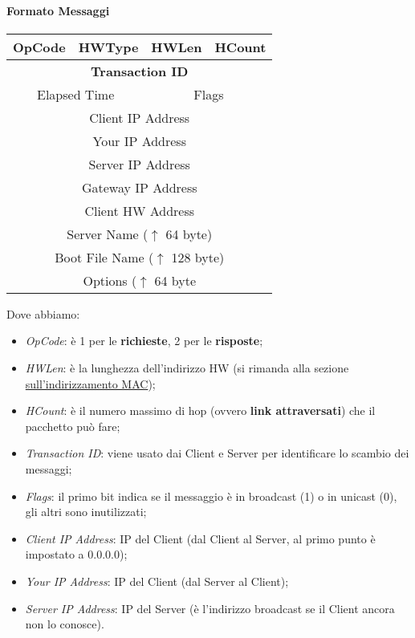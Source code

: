 \documentclass[a4paper]{article}
\begin{document}
				\paragraph{Formato Messaggi} 
				\begin{center}				
					\begin{tabular}{cccc}
						\textbf{OpCode} & \textbf{HWType} & \textbf{HWLen} & \textbf{HCount} \\
						\hline
						\multicolumn{4}{c}{\textbf{Transaction ID}} \\
						\hline
						\multicolumn{2}{c}{Elapsed Time} & \multicolumn{2}{c}{Flags} \\
						\hline
						\multicolumn{4}{c}{Client IP Address} \\
						\hline
						\multicolumn{4}{c}{Your IP Address} \\
						\hline
						\multicolumn{4}{c}{Server IP Address} \\
						\hline
						\multicolumn{4}{c}{Gateway IP Address} \\
						\hline
						\multicolumn{4}{c}{Client HW Address} \\
						\hline
						\multicolumn{4}{c}{Server Name ($ \uparrow $ 64 byte)} \\
						\hline
						\multicolumn{4}{c}{Boot File Name ($ \uparrow $ 128 byte)} \\
						\hline
						\multicolumn{4}{c}{Options ($ \uparrow $ 64 byte} \\
					\end{tabular}
				\end{center}
				
				Dove abbiamo:
				\begin{itemize}
					\item \emph{OpCode}: è 1 per le \textbf{richieste}, 2 per le \textbf{risposte};
					\item \emph{HWLen}: è la lunghezza dell'indirizzo HW (si rimanda alla sezione \\ \hyperref[sec:MAC]{sull'indirizzamento MAC});
					\item \emph{HCount}:  è il numero massimo di hop (ovvero \textbf{link attraversati}) che il pacchetto può fare;
					\item \emph{Transaction ID}: viene usato dai Client e Server per identificare lo scambio dei messaggi;
					\item \emph{Flags}: il primo bit indica se il messaggio è in broadcast (1) o in unicast (0), gli altri sono inutilizzati;
					\item \emph{Client IP Address}: IP del Client (dal Client al Server, al primo punto è impostato a 0.0.0.0);
					\item \emph{Your IP Address}: IP del Client (dal Server al Client);
					\item \emph{Server IP Address}: IP del Server (è l'indirizzo broadcast se il Client ancora non lo conosce).
				\end{itemize}
				
\end{document}
